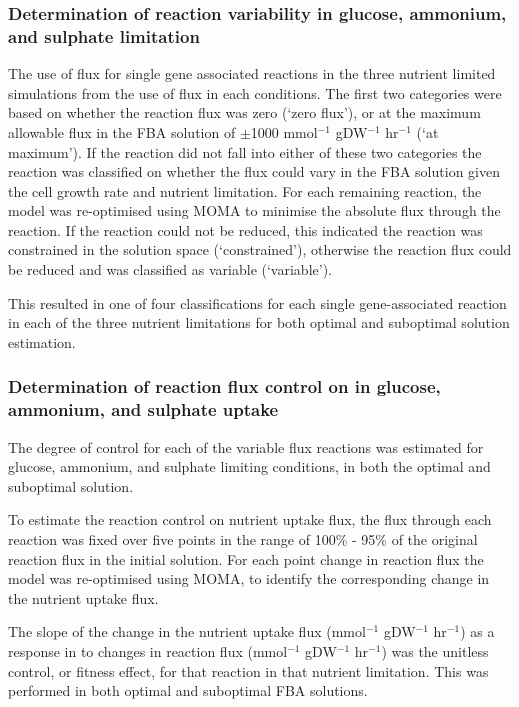 \subsubsection{Determination of reaction variability in glucose, ammonium, and sulphate limitation}%

The use of flux for single gene associated reactions in the three nutrient limited simulations from the use of flux in each conditions. The first two categories were based on whether the reaction flux was zero (`zero flux'), or at the maximum allowable flux in the FBA solution of $\pm$1000 mmol$^{-1}$ gDW$^{-1}$ hr$^{-1}$ (`at maximum'). If the reaction did not fall into either of these two categories the reaction was classified on whether the flux could vary in the FBA solution given the cell growth rate and nutrient limitation. For each remaining reaction, the model was re-optimised using MOMA to minimise the absolute flux through the reaction. If the reaction could not be reduced, this indicated the reaction was constrained in the solution space (`constrained'), otherwise the reaction flux could be reduced and was classified as variable (`variable').

This resulted in one of four classifications for each single gene-associated reaction in each of the three nutrient limitations for both optimal and suboptimal solution estimation.

\subsubsection{Determination of reaction flux control on in glucose, ammonium, and sulphate uptake}%

The degree of control for each of the variable flux reactions was estimated for glucose, ammonium, and sulphate limiting conditions, in both the optimal and suboptimal solution.

To estimate the reaction control on nutrient uptake flux, the flux through each reaction was fixed over five points in the range of 100\% - 95\% of the original reaction flux in the initial solution. For each point change in reaction flux the model was re-optimised using MOMA, to identify the corresponding change in the nutrient uptake flux.

The slope of the change in the nutrient uptake flux (mmol$^{-1}$ gDW$^{-1}$ hr$^{-1}$) as a response in to changes in reaction flux (mmol$^{-1}$ gDW$^{-1}$ hr$^{-1}$) was the unitless control, or fitness effect, for that reaction in that nutrient limitation. This was performed in both optimal and suboptimal FBA solutions.

